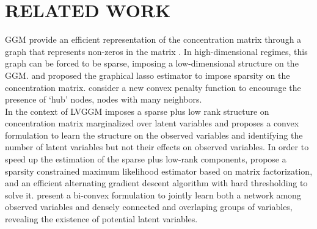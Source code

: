 \section{RELATED WORK}
\label{related}

GGM provide an efficient representation of the concentration matrix through a graph that represents non-zeros in the matrix \citep{lauritzen1996graphical}. In high-dimensional regimes, this graph can be forced to be sparse, imposing a low-dimensional structure on the GGM. \citet{yuan2007model} and \citet{banerjee2008model} proposed the graphical lasso estimator to impose sparsity on the concentration matrix. \citet{tan2014learning} consider a new convex penalty function to encourage the presence of ‘hub’ nodes, nodes with many neighbors.\\

In the context of LVGGM \citet{chandrasekaran2010} imposes a sparse plus low rank structure on concentration matrix marginalized over latent variables and proposes a convex formulation to learn the structure on the observed variables and identifying the number of latent variables but not their effects on observed variables. In order to speed
up the estimation of the sparse plus low-rank components,\citet{xu2017speeding} propose a sparsity constrained maximum likelihood estimator based on matrix factorization, and an efficient alternating gradient descent algorithm with hard thresholding to solve it. \citet{hosseini2016learning}  present a bi-convex formulation to jointly learn both a network among observed variables and densely connected and overlaping groups of variables, revealing the existence of potential latent variables. 
%

%
%
%
